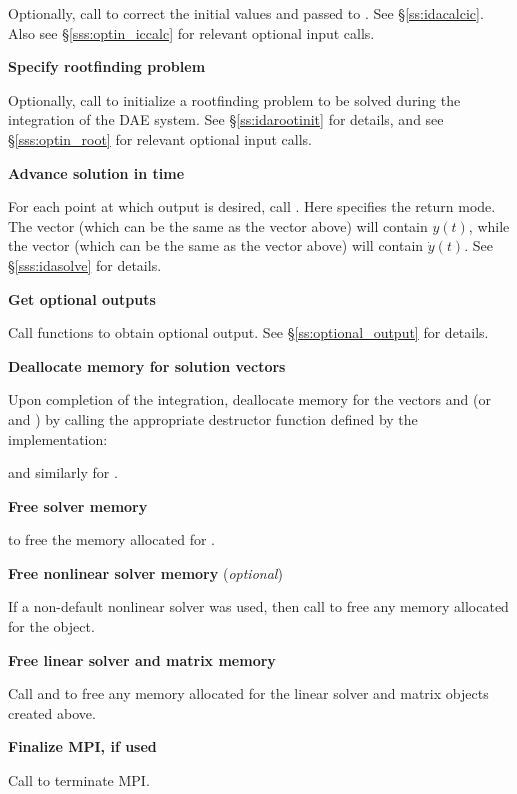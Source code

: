 \begin{Steps}
  Optionally, call  to correct the initial values
   and  passed to .  See \S\ref{ss:idacalcic}.
  Also see \S\ref{sss:optin_iccalc} for relevant optional input calls.

\item
  {\bf Specify rootfinding problem}

  Optionally, call  to initialize a rootfinding problem
  to be solved during the integration of the DAE system.
  See \S\ref{ss:idarootinit} for details, and see \S\ref{sss:optin_root}
  for relevant optional input calls.

\item
  {\bf Advance solution in time}

  For each point at which output is desired, call
  .
  Here  specifies the return mode.  The vector 
  (which can be the same as the vector  above) will contain $y(t)$,
  while the vector  (which can be the same as the vector 
  above) will contain $\dot{y}(t)$.
  See \S\ref{sss:idasolve} for details.

\item
  {\bf Get optional outputs}

  Call  functions to obtain optional output.
  See \S\ref{ss:optional_output} for details.

\item
  {\bf Deallocate memory for solution vectors}

  Upon completion of the integration, deallocate memory for the vectors 
  and  (or  and ) by calling the appropriate destructor
  function defined by the {\nvector} implementation:


  and similarly for .

\item
  {\bf Free solver memory}

   to free the memory allocated for {\ida}.

\item
  {\bf Free nonlinear solver memory} (\textit{optional})

  If a non-default nonlinear solver was used, then call
   to free any memory allocated for the
  {\sunnonlinsol} object.

\item
  {\bf Free linear solver and matrix memory}

  Call  and  to free any memory
  allocated for the linear solver and matrix objects created above.

\item
  {\bf Finalize MPI, if used}

  Call  to terminate MPI.

\end{Steps}

